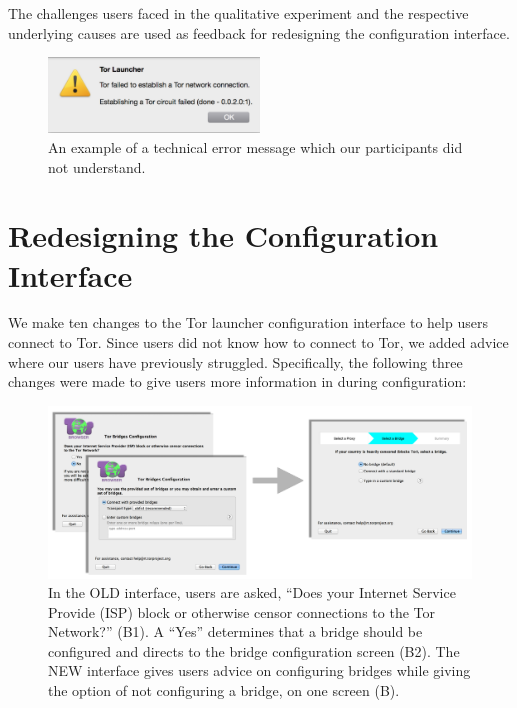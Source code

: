 \documentclass[USenglish,oneside,twocolumn]{article}
\begin{document}
The challenges users faced in the qualitative experiment and the respective underlying causes are used as feedback for redesigning the configuration interface. 

\begin{figure}[t]
  \centering
    \includegraphics[width=0.5\textwidth]{error.png}
    \caption{An example of a technical error message which our participants did not understand.}
\label{fig:error}
\end{figure}

\section{Redesigning the Configuration Interface}
We make ten changes to the Tor launcher configuration interface to help users connect to Tor. Since users did not know how to connect to Tor, we added advice where our users have previously struggled. Specifically, the following three changes were made to give users more information in during configuration: \\

\label{redesign} 

 \begin{figure}[t]
	\centering
		\includegraphics[width=.8\textwidth]{bridge-screens.pdf} 
		\caption{In the OLD interface, users are asked, ``Does your Internet Service Provide (ISP) block or 
		otherwise censor connections to the Tor Network?'' (B1). A ``Yes'' determines that a bridge should 
		be configured and directs to the bridge configuration screen (B2). 
		The NEW interface gives users advice on configuring bridges
		while giving the option of not configuring a bridge, on one screen (B).} 
\end{figure} 
\end{document}
